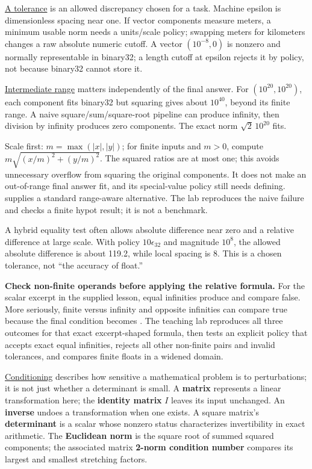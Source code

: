 \hypertarget{01-foundations-i-ch001-representation-lessons-applied-to-numerical-apis}{}

\hyperref[appendix-0ec599f8ba27]{A tolerance} is an allowed discrepancy chosen for a task. Machine epsilon is dimensionless spacing near one. If vector components measure meters, a minimum usable norm needs a units/scale policy; swapping meters for kilometers changes a raw absolute numeric cutoff. A vector \((10^{-8},0)\) is nonzero and normally representable in binary32; a length cutoff at epsilon rejects it by policy, not because binary32 cannot store it.

\hyperref[appendix-7f1e17dcafb1]{Intermediate range} matters independently of the final answer. For \((10^{20},10^{20})\), each component fits binary32 but squaring gives about \(10^{40}\), beyond its finite range. A naive square/sum/square-root pipeline can produce infinity, then division by infinity produces zero components. The exact norm \(\sqrt2\,10^{20}\) fits.

Scale first: \(m=\max(|x|,|y|)\); for finite inputs and \(m>0\), compute \(m\sqrt{(x/m)^2+(y/m)^2}\). The squared ratios are at most one; this avoids unnecessary overflow from squaring the original components. It does not make an out-of-range final answer fit, and its special-value policy still needs defining.  supplies a standard range-aware alternative. The lab reproduces the naive failure and checks a finite hypot result; it is not a benchmark.

A hybrid equality test often allows absolute difference near zero and a relative difference at large scale. With policy \(10\epsilon_{32}\) and magnitude \(10^8\), the allowed absolute difference is about 119.2, while local spacing is 8. This is a chosen tolerance, not ``the accuracy of float.''

\textbf{Check non-finite operands before applying the relative formula.} For the scalar excerpt in the supplied lesson, equal infinities produce  and compare false. More seriously, finite versus infinity and opposite infinities can compare true because the final condition becomes . The teaching lab reproduces all three outcomes for that exact excerpt-shaped formula, then tests an explicit policy that accepts exact equal infinities, rejects all other non-finite pairs and invalid tolerances, and compares finite floats in a widened domain.

\hyperref[appendix-8f6a01f284a7]{Conditioning} describes how sensitive a mathematical problem is to perturbations; it is not just whether a determinant is small. A \textbf{matrix} represents a linear transformation here; the \textbf{identity matrix} \(I\) leaves its input unchanged. An \textbf{inverse} undoes a transformation when one exists. A square matrix's \textbf{determinant} is a scalar whose nonzero status characterizes invertibility in exact arithmetic. The \textbf{Euclidean norm} is the square root of summed squared components; the associated matrix \textbf{2-norm condition number} compares its largest and smallest stretching factors.

